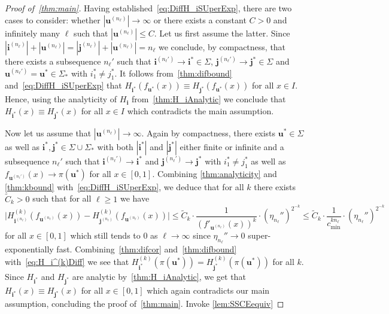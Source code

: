 \documentclass[12pt,]{article}
\def\cref#1{\ref{#1}}%
\theoremstyle{definition}
\theoremstyle{remark}
\newcommand{\0}{\mathbf{0}}
\newcommand{\bi}{\mathbf{i}}
\newcommand{\bj}{\mathbf{j}}
\newcommand{\bu}{\mathbf{u}}
\begin{document}
{\begin{proof}[Proof of~\cref{thm:main}]
Having established~\cref{eq:DiffH_iSUperExp}, there are two cases to consider: whether
$|\bu^{(n_\ell)}| \to \infty$ or there exists a constant $C>0$ and infinitely many $\ell$ such that
$|\bu^{(n_\ell)}| \leq C$. Let us first assume the latter. Since $|\bi^{(n_\ell)}|+ |\bu^{(n_\ell)}|
= |\bj^{(n_\ell)}|+|\bu^{(n_\ell)}| = n_\ell$ we conclude, by compactness, that
there exists a subsequence $n_\ell'$ such that $\bi^{(n_\ell')} \to \bi^*\in\Sigma$,
$\bj^{(n_\ell')}\to\bj^*\in\Sigma$ and $\bu^{(n_\ell')}=\bu^*\in\Sigma_*$ with $i_1^*\neq j_1^*$.
It follows from~\cref{thm:difbound} and~\cref{eq:DiffH_iSUperExp} that
$
  H_{\bi^*}(f_{\bu^*}(x))\equiv H_{\bj^*}(f_{\bu^*}(x))
$
for all $x\in I$.  Hence, using the analyticity of $H_{\bi}$ from~\cref{thm:H_iAnalytic} we conclude
that $H_{\bi^*}(x) \equiv H_{\bj^*}(x)$ for all $x\in I$ which contradicts the main assumption.

Now let us assume that $|\bu^{(n_\ell)}| \to \infty$. Again by compactness, there exists
$\bu^*\in\Sigma$ as well as $\bi^*,\bj^*\in\Sigma\cup\Sigma_*$ {\color{red} with both $|\bi^*|$ and
$|\bj^*|$ either finite or infinite} and a
subsequence $n_\ell'$ such that $\bi^{(n_\ell')}\to \bi^*$ and $\bj^{(n_\ell')}\to \bj^*$ with
$i_1^*\neq j_1^*$ as well as $f_{\bu^{(n_\ell')}}(x) \to \pi(\bu^*)$ for all $x\in[0,1]$.  Combining
\cref{thm:analyticity} and \cref{thm:kbound} with~\cref{eq:DiffH_iSUperExp}, we deduce that for all
$k$ there
exists $\widetilde{C}_k>0$ such that for all $\ell\geq 1$ we have
\begin{equation}\label{eq:H_i^(k)Diff}
  \big|H_{\bi^{(n_\ell)}}^{(k)}(f_{\bu^{(n_\ell)}}(x)) - H_{\bj^{(n_\ell)}}^{(k)}(f_{\bu^{(n_\ell)}}(x))\big|
  \leq \widetilde{C}_k \cdot
  \frac{1}{(f'_{\bu^{(n_\ell)}}(x))^k}\cdot\left(\eta_{n_\ell}''\right)^{2^{-k}}\leq\widetilde{C}_k
  \cdot \frac{1}{c_{\min}^{k n_\ell}}\cdot\left(\eta_{n_\ell}''\right)^{2^{-k}}
\end{equation}
for all $x\in[0,1]$ which still tends to $0$ as $\ell\to\infty$ since $\eta_{n_{\ell}}''\to 0$
super-exponentially fast. Combining~\cref{thm:difcor} and~\cref{thm:difbound}
with~\cref{eq:H_i^(k)Diff} we see that $H_{\bi^*}^{(k)}(\pi(\bu^*))=H_{\bj^*}^{(k)}(\pi(\bu^*))$ for
all $k$.
Since $H_{\bi^*}$ and $H_{\bj^*}$ are analytic by~\cref{thm:H_iAnalytic}, we get that
$H_{\bi^*}(x)\equiv H_{\bj^*}(x)$ for all
$x\in[0,1]$ which again contradicts our main assumption, concluding the proof of~\cref{thm:main}. 
{\color{red} Invoke \cref{lem:SSCEequiv}}
\end{proof}


}
\end{document}
